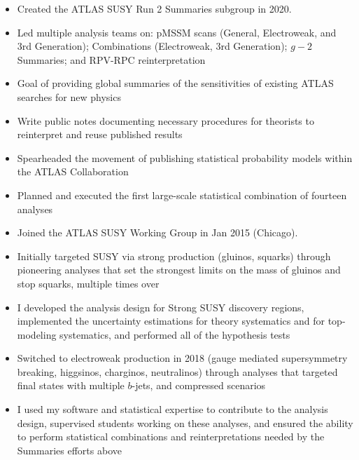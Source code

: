 \begin{itemize}
	\item Created the ATLAS SUSY Run 2 Summaries subgroup in 2020.
  \item Led multiple analysis teams on: pMSSM scans (General, Electroweak, and 3rd Generation); Combinations (Electroweak, 3rd Generation); $g-2$ Summaries; and RPV-RPC reinterpretation
  \item Goal of providing global summaries of the sensitivities of existing ATLAS searches for new physics
  \item Write public notes documenting necessary procedures for theorists to reinterpret and reuse published results
  \item Spearheaded the movement of publishing statistical probability models within the ATLAS Collaboration
  \item Planned and executed the first large-scale statistical combination of fourteen analyses
\end{itemize}


\begin{itemize}
  \item Joined the ATLAS SUSY Working Group in Jan 2015 (Chicago).
  \item Initially targeted SUSY via strong production (gluinos, squarks) through pioneering analyses that set the strongest limits on the mass of gluinos and stop squarks, multiple times over
  \item I developed the analysis design for Strong SUSY discovery regions, implemented the uncertainty estimations for theory systematics and for top-modeling systematics, and performed all of the hypothesis tests
  \item Switched to electroweak production in 2018 (gauge mediated supersymmetry breaking, higgsinos, charginos, neutralinos) through analyses that targeted final states with multiple $b$-jets, and compressed scenarios
  \item I used my software and statistical expertise to contribute to the analysis design, supervised students working on these analyses, and ensured the ability to perform statistical combinations and reinterpretations needed by the Summaries efforts above
\end{itemize}


